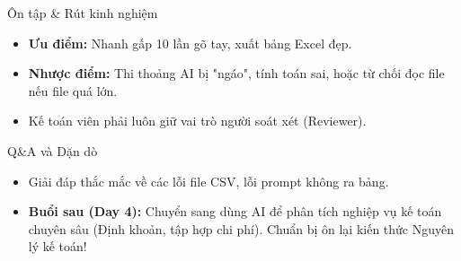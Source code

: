 \documentclass[aspectratio=169]{beamer}
\begin{document}
\begin{frame}{Ôn tập \& Rút kinh nghiệm}
    \begin{itemize}
        \item \textbf{Ưu điểm:} Nhanh gấp 10 lần gõ tay, xuất bảng Excel đẹp.
        \item \textbf{Nhược điểm:} Thi thoảng AI bị "ngáo", tính toán sai, hoặc từ chối đọc file nếu file quá lớn.
        \item Kế toán viên phải luôn giữ vai trò người soát xét (Reviewer).
    \end{itemize}
\end{frame}


\begin{frame}{Q\&A và Dặn dò}
    \begin{itemize}
        \item Giải đáp thắc mắc về các lỗi file CSV, lỗi prompt không ra bảng.
        \item \textbf{Buổi sau (Day 4):} Chuyển sang dùng AI để phân tích nghiệp vụ kế toán chuyên sâu (Định khoản, tập hợp chi phí). Chuẩn bị ôn lại kiến thức Nguyên lý kế toán!
    \end{itemize}
\end{frame}
\end{document}
